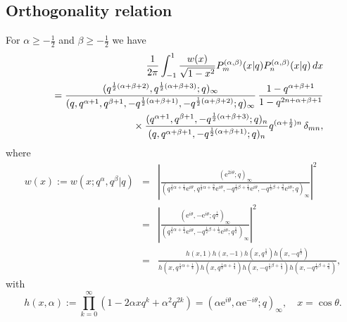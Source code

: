 \documentclass[envcountchap,graybox]{svmono}
\newcommand{\mathindent}{\hspace{7.5mm}}
\newcommand{\e}{\textrm{e}}
\begin{document}
\newpage

\subsection*{Orthogonality relation}
For $\alpha\geq -\frac{1}{2}$ and $\beta\geq -\frac{1}{2}$ we have
\begin{eqnarray}
\label{OrtContqJacobi}
& &\frac{1}{2\pi}\int_{-1}^1\frac{w(x)}{\sqrt{1-x^2}}
P_m^{(\alpha,\beta)}(x|q)P_n^{(\alpha,\beta)}(x|q)\,dx\nonumber\\
& &{}=\frac{(q^{\frac{1}{2}(\alpha+\beta+2)},q^{\frac{1}{2}(\alpha+\beta+3)};q)_{\infty}}{(q,q^{\alpha+1},q^{\beta+1},-q^{\frac{1}{2}(\alpha+\beta+1)},
-q^{\frac{1}{2}(\alpha+\beta+2)};q)_{\infty}}\,\frac{1-q^{\alpha+\beta+1}}{1-q^{2n+\alpha+\beta+1}}\nonumber\\
& &{}\mathindent{}\times\frac{(q^{\alpha+1},q^{\beta+1},-q^{\frac{1}{2}(\alpha+\beta+3)};q)_n}
{(q,q^{\alpha+\beta+1},-q^{\frac{1}{2}(\alpha+\beta+1)};q)_n}q^{(\alpha+\frac{1}{2})n}\,\delta_{mn},
\end{eqnarray}
where
\begin{eqnarray*} w(x):=w(x;q^{\alpha},q^{\beta}|q)&=&\left|\frac{(\e^{2i\theta};q)_{\infty}}
{(q^{\frac{1}{2}\alpha+\frac{1}{4}}\e^{i\theta},q^{\frac{1}{2}\alpha+\frac{3}{4}}\e^{i\theta},
-q^{\frac{1}{2}\beta+\frac{1}{4}}\e^{i\theta},-q^{\frac{1}{2}\beta+\frac{3}{4}}\e^{i\theta};q)_{\infty}}\right|^2\\
&=&\left|\frac{(\e^{i\theta},-\e^{i\theta};q^{\frac{1}{2}})_{\infty}}{(q^{\frac{1}{2}\alpha+\frac{1}{4}}\e^{i\theta},
-q^{\frac{1}{2}\beta+\frac{1}{4}}\e^{i\theta};q^{\frac{1}{2}})_{\infty}}\right|^2\\
&=&\frac{h(x,1)h(x,-1)h(x,q^{\frac{1}{2}})h(x,-q^{\frac{1}{2}})}
{h(x,q^{\frac{1}{2}\alpha+\frac{1}{4}})h(x,q^{\frac{1}{2}\alpha+\frac{3}{4}})
h(x,-q^{\frac{1}{2}\beta+\frac{1}{4}})h(x,-q^{\frac{1}{2}\beta+\frac{3}{4}})},
\end{eqnarray*}
with
$$h(x,\alpha):=\prod_{k=0}^{\infty}\left(1-2\alpha xq^k+\alpha^2q^{2k}\right)
=\left(\alpha \e^{i\theta},\alpha \e^{-i\theta};q\right)_{\infty},\quad x=\cos\theta.$$
\end{document}
